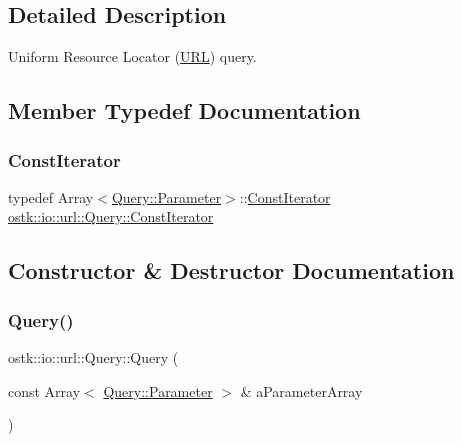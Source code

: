 \subsection{Detailed Description}
Uniform Resource Locator (\hyperlink{classostk_1_1io_1_1_u_r_l}{U\+RL}) query. 

\subsection{Member Typedef Documentation}
\mbox{\label{classostk_1_1io_1_1url_1_1_query_a64eb73f998c55a48d25b4ce116d66f1a}} 
\subsubsection{\texorpdfstring{Const\+Iterator}{ConstIterator}}
{\footnotesize\ttfamily typedef Array$<$\hyperlink{classostk_1_1io_1_1url_1_1_query_1_1_parameter}{Query\+::\+Parameter}$>$\+::\hyperlink{classostk_1_1io_1_1url_1_1_query_a64eb73f998c55a48d25b4ce116d66f1a}{Const\+Iterator} \hyperlink{classostk_1_1io_1_1url_1_1_query_a64eb73f998c55a48d25b4ce116d66f1a}{ostk\+::io\+::url\+::\+Query\+::\+Const\+Iterator}}



\subsection{Constructor \& Destructor Documentation}
\mbox{\label{classostk_1_1io_1_1url_1_1_query_a10299b6b445c39886d6b689c14364fe1}} 
\subsubsection{\texorpdfstring{Query()}{Query()}}
{\footnotesize\ttfamily ostk\+::io\+::url\+::\+Query\+::\+Query (\begin{DoxyParamCaption}\item[{const Array$<$ \hyperlink{classostk_1_1io_1_1url_1_1_query_1_1_parameter}{Query\+::\+Parameter} $>$ \&}]{a\+Parameter\+Array }\end{DoxyParamCaption})}



